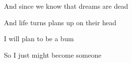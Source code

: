 \begin{song}
\bigskip

\PrechorusAndChorus \par

\bigskip

And since we know that dreams are dead \par
And life turns plans up on their head \par
I will plan to be a bum \par
So I just might become someone \par
{} \par

\bigskip

\PrechorusAndChorus \par
{}

\bigskip

\end{song}
